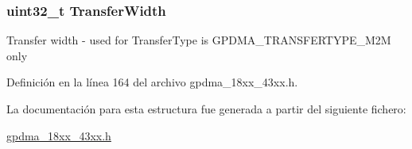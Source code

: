 \subsubsection[{\texorpdfstring{Transfer\+Width}{TransferWidth}}]{\setlength{\rightskip}{0pt plus 5cm}uint32\+\_\+t Transfer\+Width}\hypertarget{struct_g_p_d_m_a___c_h___c_f_g___t_a0cb76a8204c8f81b9ac1ab3c8840c499}{}\label{struct_g_p_d_m_a___c_h___c_f_g___t_a0cb76a8204c8f81b9ac1ab3c8840c499}
Transfer width -\/ used for Transfer\+Type is G\+P\+D\+M\+A\+\_\+\+T\+R\+A\+N\+S\+F\+E\+R\+T\+Y\+P\+E\+\_\+\+M2M only 

Definición en la línea 164 del archivo gpdma\+\_\+18xx\+\_\+43xx.\+h.



La documentación para esta estructura fue generada a partir del siguiente fichero\+:\begin{DoxyCompactItemize}
\item 
\hyperlink{gpdma__18xx__43xx_8h}{gpdma\+\_\+18xx\+\_\+43xx.\+h}\end{DoxyCompactItemize}
